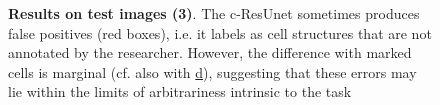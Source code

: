 \begin{figure}[ht]\ContinuedFloat
\centering
{}
\caption{\textbf{Results on test images (3)}. 
The c-ResUnet sometimes produces false positives (red boxes), i.e. it labels as cell structures that are not annotated by the researcher.
However, the difference with marked cells is marginal (cf. also with \hyperref[fig:predictions:false-negatives]{d}), suggesting that these errors may lie within the limits of arbitrariness intrinsic to the task
} 
\end{figure}


